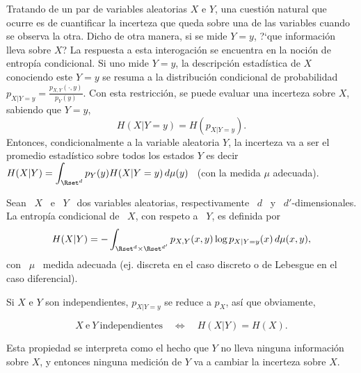 \label{Sec:SZ:Mutua}

Tratando de un par de variables aleatorias $X$ e $Y$, una cuesti\'on natural que
ocurre  es de  cuantificar la  incerteza que  queda sobre  una de  las variables
cuando se  observa la otra.   Dicho de otra  manera, si se  mide $Y =  y$, ?`que
informaci\'on lleva sobre  $X$? La respuesta a esta  interogaci\'on se encuentra
en la noci\'on de entrop\'ia condicional.  Si uno mide $Y = y$, la descripci\'on
estad\'istica  de $X$  conociendo este  $Y =  y$ se  resuma a  la distribuci\'on
condicional de probabilidad  $p_{X|Y=y} = \frac{p_{X,Y}(\cdot,y)}{p_Y(y)}$.  Con
esta  restricci\'on, se  puede evaluar  una  incerteza sobre  $X$, sabiendo  que
$Y=y$,
%
\[
H(X|Y=y) = H\left( p_{X|Y=y} \right).
\]
%
Entonces, condicionalmente a la variable aleatoria $Y$, la incerteza va a ser el
promedio  estad\'istico sobre  todos  los estados  $Y$  es decir  $\displaystyle
H(X|Y)  = \int_{\Rset^d}  p_Y(y) H(X|Y=y)  \, d\mu(y)$  \ (con  la  medida $\mu$
adecuada).
%
\begin{definicion}
\label{Def:SZ:entropiacondicional}
%
  Sean \ $X$ \ e \ $Y$ \ dos variables aleatorias, respectivamente \ $d$ \ y \
  $d'$-dimensionales. La entrop\'ia condicional de  \ $X$, con respeto a \ $Y$,
  es definida por
  \[
  H(X|Y)   =   -  \int_{\Rset^d   \times   \Rset^{d'}}  p_{X,Y}(x,y)   \log
  p_{X|Y=y}(x) \, d\mu(x,y),
  \]
  con \ $\mu$ \ medida adecuada (ej.  discreta en el caso discreto o de Lebesgue
  en el caso diferencial).
\end{definicion}

Si  $X$ e  $Y$ son  independientes,  $p_{X|Y=y}$ se  reduce a  $p_X$, as\'i  que
obviamente,
%
\begin{propiedades}
\item\label{Prop:SZ:independenciacondicional}
  \[
  X \: \mbox{e} \: Y \: \mbox{independientes} \quad \Leftrightarrow \quad H(X|Y)
  = H(X).
  \]
\end{propiedades}
%
Esta  propiedad  se   interpreta  como  el  hecho  que   $Y$  no  lleva  ninguna
informaci\'on sobre  $X$, y entonces ninguna  medici\'on de $Y$ va  a cambiar la
incerteza sobre $X$.

